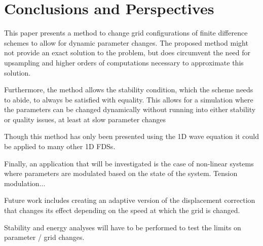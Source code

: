 \section{Conclusions and Perspectives}\label{sec:conclusion}
This paper presents a method to change grid configurations of finite difference schemes to allow for dynamic parameter changes. The proposed method might not provide an exact solution to the problem, but does circumvent the need for upsampling and higher orders of computations necessary to approximate this solution. %

Furthermore, the method allows the stability condition, which the scheme needs to abide, to always be satisfied with equality. This allows for a simulation where the parameters can be changed dynamically without running into either stability or quality issues, at least at slow parameter changes



Though this method has only been presented using the 1D wave equation it could be applied to many other 1D FDSs. 


Finally, an application that will be investigated is the case of non-linear systems where parameters are modulated based on the state of the system. Tension modulation...


Future work includes creating an adaptive version of the displacement correction that changes its effect depending on the speed at which the grid is changed.

Stability and energy analyses will have to be performed to test the limits on parameter / grid changes.
